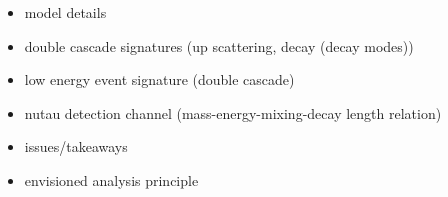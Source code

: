 \documentclass[a4paper,11pt]{article}
\begin{document}
\begin{itemize}
    \item model details
    \item double cascade signatures (up scattering, decay (decay modes))
    \item low energy event signature (double cascade)
    \item nutau detection channel (mass-energy-mixing-decay length relation)
    \item issues/takeaways
    \item envisioned analysis principle
\end{itemize}






\footnotesize


\end{document}
